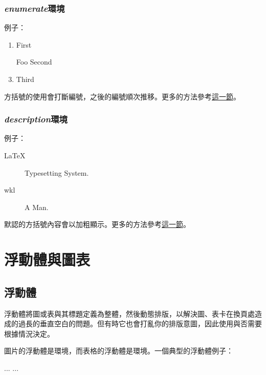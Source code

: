 \subsubsection{\textit{enumerate}環境}
例子：

\begin{codeshow}
\begin{enumerate}
  \item First
  \item[Foo] Second
  \item Third
\end{enumerate}
\end{codeshow}

方括號的使用會打斷編號，之後的編號順次推移。更多的方法參考\hyperref[sec:list]{這一節}。

\subsubsection{\textit{description}環境}
例子：

\begin{codeshow}
\begin{description}
  \item[LaTeX] Typesetting System.
  \item[wkl] A Man.
\end{description}
\end{codeshow}

默認的方括號內容會以加粗顯示。更多的方法參考\hyperref[sec:list]{這一節}。

\section{浮動體與圖表}
\label{sec:float}

\subsection{浮動體}
浮動體將圖或表與其標題定義為整體，然後動態排版，以解決圖、表卡在換頁處造成的過長的垂直空白的問題。但有時它也會打亂你的排版意圖，因此使用與否需要根據情況決定。

圖片的浮動體是環境，而表格的浮動體是環境。一個典型的浮動體例子：
\begin{latex}
\begin{table}[!htb]
    \centering
    \caption{table-cap}
    \label{table-name}
    \begin{tabular}{...}
        ...
    \end{tabular}
\end{table}
\end{latex}

